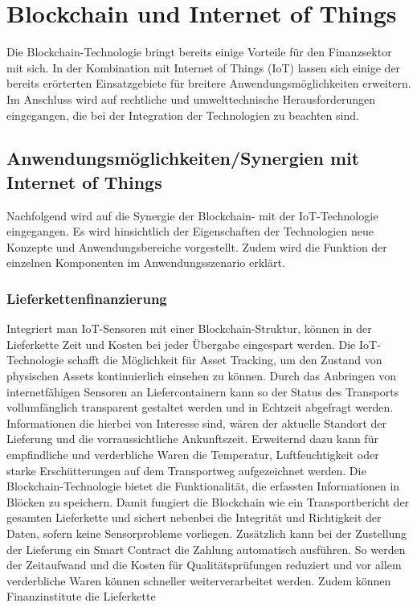 \section{Blockchain und Internet of Things}
Die Blockchain-Technologie bringt bereits einige Vorteile für den Finanzsektor mit sich.
In der Kombination mit Internet of Things (IoT) lassen sich einige der bereits erörterten Einsatzgebiete
für breitere Anwendungsmöglichkeiten erweitern. Im Anschluss wird auf rechtliche und umwelttechnische
Herausforderungen eingegangen, die bei der Integration der Technologien zu beachten sind.

\subsection{Anwendungsmöglichkeiten/Synergien mit Internet of Things}
Nachfolgend wird auf die Synergie der Blockchain- mit der IoT-Technologie eingegangen. 
Es wird hinsichtlich der Eigenschaften der Technologien neue Konzepte und Anwendungsbereiche vorgestellt.
Zudem wird die Funktion der einzelnen Komponenten im Anwendungsszenario erklärt.



\subsubsection{Lieferkettenfinanzierung}
Integriert man IoT-Sensoren mit einer Blockchain-Struktur, können in der Lieferkette Zeit und Kosten bei
jeder Übergabe eingespart werden.
Die IoT-Technologie schafft die Möglichkeit für Asset Tracking, um den Zustand von physischen Assets
kontinuierlich einsehen zu können. Durch das Anbringen von internetfähigen Sensoren an 
Liefercontainern kann so der Status des Transports vollumfänglich transparent gestaltet
werden und in Echtzeit abgefragt werden. 
Informationen die hierbei von Interesse sind, wären der aktuelle Standort der Lieferung und
die vorraussichtliche Ankunftszeit. Erweiternd dazu kann für empfindliche und 
verderbliche Waren die Temperatur, Luftfeuchtigkeit oder starke Erschütterungen auf dem 
Transportweg aufgezeichnet werden.
Die Blockchain-Technologie bietet die Funktionalität, die erfassten Informationen in Blöcken
zu speichern. Damit fungiert die Blockchain wie ein Transportbericht der gesamten Lieferkette und 
sichert nebenbei die Integrität und Richtigkeit der Daten, sofern keine Sensorprobleme vorliegen. 
Zusätzlich kann bei der Zustellung der Lieferung ein Smart Contract die Zahlung automatisch ausführen.
So werden der Zeitaufwand und die Kosten für Qualitätsprüfungen reduziert und vor allem verderbliche 
Waren können schneller weiterverarbeitet werden.
Zudem können Finanzinstitute die Lieferkette
\cite[p.~169f]{chowdhary2025smart}



